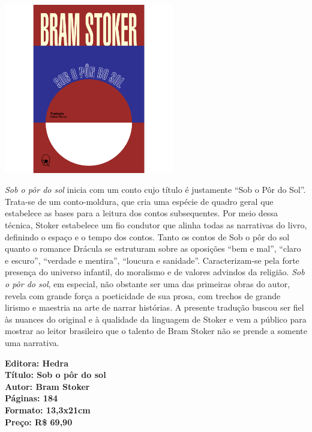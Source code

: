 \pagebreak

\begin{center}
\hspace*{-3.6cm}
\hspace*{3.1cm}\includegraphics[width=74mm]{./grid/stoker.png}
\end{center}

\hspace*{-7cm}\hrulefill\hspace*{-7cm}

\medskip

\noindent{}\textit{Sob o pôr do sol} inicia com um conto cujo título é justamente ``Sob o Pôr do Sol''. Trata-se de um conto-moldura, que cria uma espécie de quadro geral que estabelece as bases para a leitura dos contos subsequentes. Por meio dessa técnica, Stoker estabelece um fio condutor que alinha todas as narrativas do livro, definindo o espaço e o tempo dos contos. Tanto os contos de Sob o pôr do sol quanto o romance Drácula se estruturam sobre as oposições ``bem e mal'', ``claro e escuro'', ``verdade e mentira'', ``loucura e sanidade''. Caracterizam-se pela forte presença do universo infantil, do moralismo e de valores advindos da religião. \textit{Sob o pôr do sol}, em especial, não obstante ser uma das primeiras obras do autor, revela com grande força a poeticidade de sua prosa, com trechos de grande lirismo e maestria na arte de narrar histórias. A presente tradução buscou ser fiel às nuances do original e à qualidade da linguagem de Stoker e vem a público para mostrar ao leitor brasileiro que o talento de Bram Stoker não se prende a somente uma narrativa.

\vfill

\noindent\begin{minipage}[c]{1\linewidth}
{\small\textbf{
\hspace*{-.1cm}Editora: Hedra\\
Título: Sob o pôr do sol\\
Autor: Bram Stoker\\ 
Páginas: 184\\
Formato: 13,3x21cm\\
Preço: R\$ 69,90\\
}}
\end{minipage}

